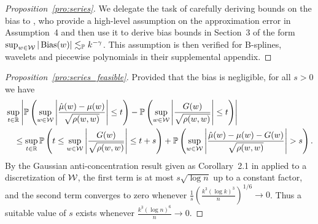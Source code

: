 \begin{proof}[Proposition~\ref{pro:series}]

  We delegate the task of carefully deriving bounds on the bias to
  \citet{cattaneo2020large}, who provide a high-level assumption on the
  approximation error in Assumption~4 and then use it to derive bias bounds in
  Section~3 of the form $\sup_{w \in \mathcal{W}} |\operatorname{Bias}(w)| \lesssim_{\mathbb{P}} k^{-\gamma}$.
  This assumption is then verified for B-splines, wavelets and piecewise
  polynomials in their supplemental appendix.

\end{proof}

\begin{proof}[Proposition~\ref{pro:series_feasible}]

  Provided that the bias is negligible,
  for all $s > 0$ we have
  \begin{align*}
    &\sup_{t \in \mathbb{R}}
    \left|
    \mathbb{P}\left(
      \sup_{w \in \mathcal{W}}
      \left|
      \frac{\hat\mu(w)-\mu(w)}{\sqrt{\rho(w,w)}}
      \right| \leq t
    \right)
    -
    \mathbb{P}\left(
      \sup_{w \in \mathcal{W}}
      \left|
      \frac{G(w)}{\sqrt{\rho(w,w)}}
      \right| \leq t
    \right)
    \right| \\
    &\quad\leq
    \sup_{t \in \mathbb{R}}
    \mathbb{P}\left(
      t \leq
      \sup_{w \in \mathcal{W}}
      \left|
      \frac{G(w)}{\sqrt{\rho(w,w)}}
      \right|
      \leq t + s
    \right)
    +
    \mathbb{P}\left(
      \sup_{w \in \mathcal{W}}
      \left|
      \frac{\hat\mu(w)-\mu(w)-G(w)}{\sqrt{\rho(w,w)}}
      \right| > s
    \right).
  \end{align*}
  By the Gaussian anti-concentration result given as Corollary~2.1 in
  \citet{chernozhukov2014anti} applied to a discretization of $\mathcal{W}$, the first
  term is at most $s \sqrt{\log n}$ up to a constant factor, and the second
  term converges to zero whenever
  $\frac{1}{s} \left( \frac{k^3 (\log k)^3}{n} \right)^{1/6} \to 0$.
  Thus a suitable value of $s$ exists whenever $\frac{k^3(\log n)^6}{n} \to 0$.



\end{proof}
